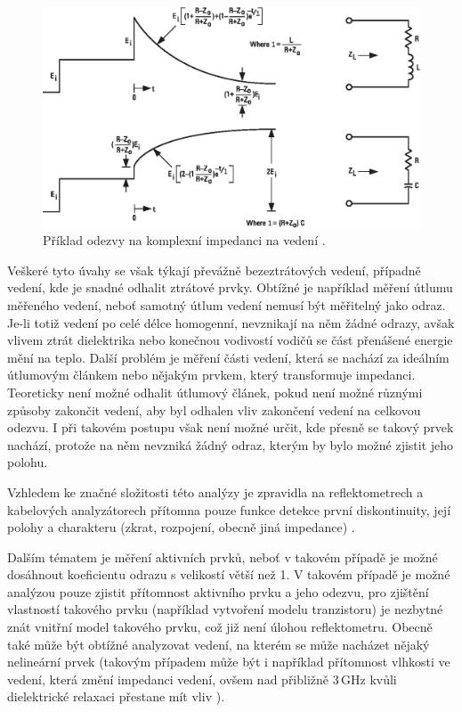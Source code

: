 \begin{figure}[htbp]\includegraphics[width=\textwidth,keepaspectratio]{images/samplecomplexresponse.eps}\caption{Příklad odezvy na komplexní impedanci na vedení \cite{broadbandreflectometry}.}\label{complexresponse}\end{figure}

Veškeré tyto úvahy se však týkají převážně bezeztrátových vedení, případně vedení, kde je snadné odhalit ztrátové prvky. Obtížné je například měření útlumu měřeného vedení, neboť samotný útlum vedení nemusí být měřitelný jako odraz. Je-li totiž vedení po celé délce homogenní, nevznikají na něm žádné odrazy, avšak vlivem ztrát dielektrika nebo konečnou vodivostí vodičů se část přenášené energie mění na teplo. Další problém je měření části vedení, která se nachází za ideálním útlumovým článkem nebo nějakým prvkem, který transformuje impedanci. Teoreticky není možné odhalit útlumový článek, pokud není možné různými způsoby zakončit vedení, aby byl odhalen vliv zakončení vedení na celkovou odezvu. I při takovém postupu však není možné určit, kde přesně se takový prvek nachází, protože na něm nevzniká žádný odraz, kterým by bylo možné zjistit jeho polohu. 

Vzhledem ke značné složitosti této analýzy je zpravidla na reflektometrech a kabelových analyzátorech přítomna pouze funkce detekce první diskontinuity, její polohy a charakteru (zkrat, rozpojení, obecně jiná impedance) \cite{CT-100Bmanual} .

Dalším tématem je měření aktivních prvků, neboť v takovém případě je možné dosáhnout koeficientu odrazu s velikostí větší než 1. V takovém případě je možné analýzou pouze zjistit přítomnost aktivního prvku a jeho odezvu, pro zjištění vlastností takového prvku (například vytvoření modelu tranzistoru) je nezbytné znát vnitřní model takového prvku, což již není úlohou reflektometru. Obecně také může být obtížné analyzovat vedení, na kterém se může nacházet nějaký nelineární prvek (takovým případem může být i například přítomnost vlhkosti ve vedení, která změní impedanci vedení, ovšem nad přibližně 3\,GHz kvůli dielektrické relaxaci přestane mít vliv \cite{relaxationspectroscopy}).

